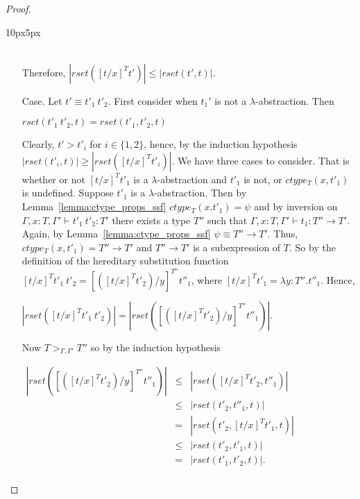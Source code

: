 \begin{proof}
\begin{changemargin}{10px}{5px}
\begin{itemize}
\begin{center}
\begin{math}
\begin{array}{lll}
      \end{array}
    \end{math}
  \end{center}
  Therefore, $|rset([t/x]^T t')| \leq |rset(t',t)|$.
  
\item[Case.] Let $t' \equiv t'_1\ t'_2$.  First consider when $t_1'$ is not a $\lambda$-abstraction. Then
  \begin{center}
    $rset(t'_1\ t'_2, t) = rset(t'_1, t'_2, t)$
  \end{center}  
  Clearly,  $t' > t'_i$ for $i \in \{1,2\}$, hence, by the induction hypothesis $|rset(t'_i,t)| \geq |rset([t/x]^T t'_i)|$.  
  We have three cases to consider.  That is whether or not $[t/x]^T t'_1$ is a $\lambda$-abstraction and $t'_1$ is not, or
  $ctype_T(x,t'_1)$ is undefined.  
  Suppose $t'_1$ is a $\lambda$-abstraction.
  Then by Lemma~\ref{lemma:ctype_props_ssf} $ctype_T(x.t'_1) = \psi$ and by inversion on $\Gamma,x:T,\Gamma' \vdash t'_1\ t'_2:T'$
  there exists a type $T''$ such that $\Gamma,x:T,\Gamma' \vdash t_1:T'' \to T'$.  Again, by Lemma~\ref{lemma:ctype_props_ssf}
  $\psi \equiv T'' \to T'$. Thus, $ctype_T(x,t'_1) = T'' \to T'$ and $T'' \to T'$ is a subexpression of $T$.
  So by the definition of the hereditary substitution function $[t/x]^T t'_1\ t'_2 = [([t/x]^T t'_2)/y]^{T''} t''_1$, where
  $[t/x]^T t'_1 = \lambda y:T''.t''_1$.  Hence,
  \begin{center}
    \begin{math}
      |rset([t/x]^T t'_1\ t'_2)| = |rset([([t/x]^T t'_2)/y]^{T''} t''_1)|.
    \end{math}
  \end{center}
  Now $T >_{\Gamma,\Gamma'} T''$ so by the induction hypothesis 
  \begin{center}
    \begin{math}
      \begin{array}{lll}
        |rset([([t/x]^T t'_2)/y]^{T''} t''_1)| & \leq & |rset([t/x]^T t'_2, t''_1)|\\
        & \leq & |rset(t'_2, t''_1, t)|\\
        & = & |rset(t'_2, [t/x]^T t'_1, t)|\\
        & \leq & |rset(t'_2, t'_1, t)|\\
        & = & |rset(t'_1, t'_2, t)|.\\
      \end{array}
    \end{math}
  \end{center}


\end{itemize}
\end{changemargin}
\end{proof}
